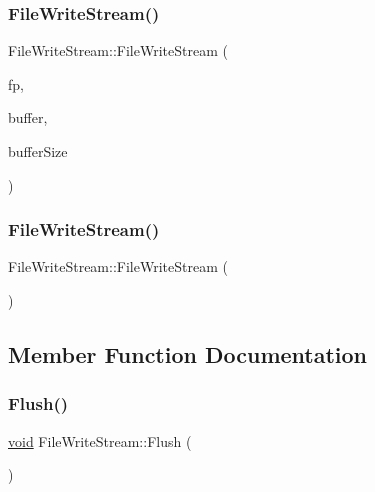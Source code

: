 \subsubsection{\texorpdfstring{File\+Write\+Stream()}{FileWriteStream()}\hspace{0.1cm}{\footnotesize\ttfamily [1/2]}}
{\footnotesize\ttfamily File\+Write\+Stream\+::\+File\+Write\+Stream (\begin{DoxyParamCaption}\item[{std\+::\+F\+I\+LE $\ast$}]{fp,  }\item[{char $\ast$}]{buffer,  }\item[{size\+\_\+t}]{buffer\+Size }\end{DoxyParamCaption})\hspace{0.3cm}{\ttfamily [inline]}}

\mbox{\label{classFileWriteStream_a62cc69f885b946b6bc2935f40c970cbb}} 
\subsubsection{\texorpdfstring{File\+Write\+Stream()}{FileWriteStream()}\hspace{0.1cm}{\footnotesize\ttfamily [2/2]}}
{\footnotesize\ttfamily File\+Write\+Stream\+::\+File\+Write\+Stream (\begin{DoxyParamCaption}\item[{const \hyperlink{classFileWriteStream}{File\+Write\+Stream} \&}]{ }\end{DoxyParamCaption})\hspace{0.3cm}{\ttfamily [private]}}



\subsection{Member Function Documentation}
\mbox{\label{classFileWriteStream_a939fbf183ba36464c5e0837df4329d37}} 
\subsubsection{\texorpdfstring{Flush()}{Flush()}}
{\footnotesize\ttfamily \hyperlink{imgui__impl__opengl3__loader_8h_ac668e7cffd9e2e9cfee428b9b2f34fa7}{void} File\+Write\+Stream\+::\+Flush (\begin{DoxyParamCaption}{ }\end{DoxyParamCaption})\hspace{0.3cm}{\ttfamily [inline]}}

